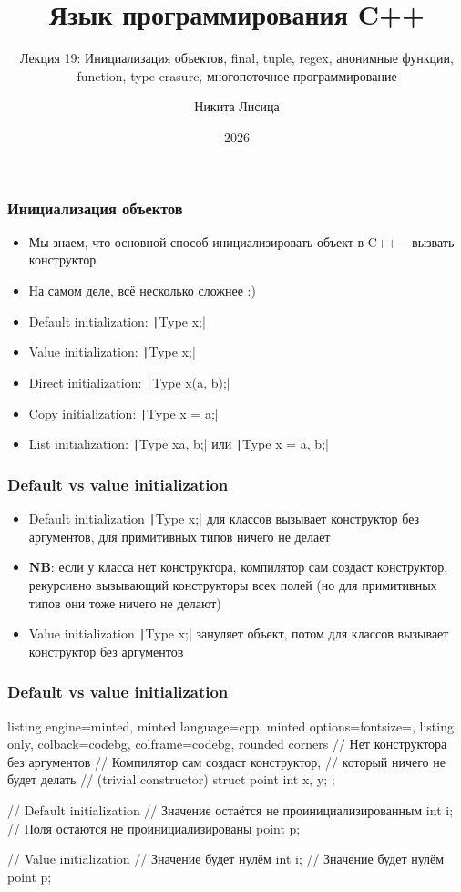 \documentclass[10pt]{beamer}
\title{Язык программирования C++}
\subtitle{Лекция 19: Инициализация объектов, final, tuple, regex, анонимные функции, function, type erasure, многопоточное программирование}
\date{2026}
\author{Никита Лисица}
\begin{document}
\frame{\titlepage}


\begin{frame}[fragile]
\frametitle{Инициализация объектов}
\begin{itemize}
\item Мы знаем, что основной способ инициализировать объект в C++ -- вызвать конструктор
\pause
\item На самом деле, всё несколько сложнее :)
\pause
\item Default initialization: \texttt|Type x;|
\pause
\item Value initialization: \texttt|Type x{};|
\pause
\item Direct initialization: \texttt|Type x(a, b);|
\pause
\item Copy initialization: \texttt|Type x = a;|
\pause
\item List initialization: \texttt|Type x{a, b};| или \texttt|Type x = {a, b};|
\end{itemize}
\end{frame}

\begin{frame}[fragile]
\frametitle{Default vs value initialization}
\begin{itemize}
\item Default initialization \texttt|Type x;| для классов вызывает конструктор без аргументов, для примитивных типов ничего не делает
\pause
\item \textbf{NB}: если у класса нет конструктора, компилятор сам создаст конструктор, рекурсивно вызывающий конструкторы всех полей (но для примитивных типов они тоже ничего не делают)
\pause
\item Value initialization \texttt|Type x{};| зануляет объект, потом для классов вызывает конструктор без аргументов
\end{itemize}
\end{frame}

\begin{frame}[fragile]
\frametitle{Default vs value initialization}
\begin{itemize}
\begin{tcblisting}{listing engine=minted, minted language=cpp, minted options={fontsize=\scriptsize}, listing only, colback=codebg, colframe=codebg, rounded corners}
// Нет конструктора без аргументов
// Компилятор сам создаст конструктор,
// который ничего не будет делать
// (trivial constructor)
struct point {
  int x, y;
};

// Default initialization
// Значение остаётся не проинициализированным
int i;
// Поля остаются не проинициализированы
point p;

// Value initialization
// Значение будет нулём
int i{};
// Значение будет нулём
point p{};
\end{tcblisting}
\end{itemize}
\end{frame}
\end{document}
